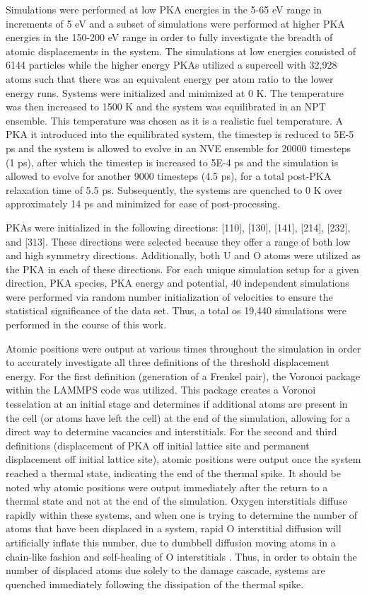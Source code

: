 \documentclass[8pt]{article}   	%
\begin{document}
Simulations were performed at low PKA energies in the 5-65 eV range in increments of 5 eV and a subset of simulations were performed at higher PKA energies in the 150-200 eV range in order to fully investigate the breadth of atomic displacements in the system. The simulations at low energies consisted of 6144 particles while the higher energy PKAs utilized a supercell with 32,928 atoms such that there was an equivalent energy per atom ratio to the lower energy runs. Systems were initialized and minimized at 0 K. The temperature was then increased to 1500 K and the system was equilibrated in an NPT ensemble. This temperature was chosen as it is a realistic fuel temperature. A PKA it introduced into the equilibrated system, the timestep is reduced to 5E-5 ps and the system is allowed to evolve in an NVE ensemble for 20000 timesteps (1 ps), after which the timestep is increased to 5E-4 ps and the simulation is allowed to evolve for another 9000 timesteps (4.5 ps), for a total post-PKA relaxation time of 5.5 ps.  Subsequently, the systems are quenched to 0 K over approximately 14 ps and minimized for ease of post-processing. 

PKAs were initialized in the following directions: [110], [130], [141], [214], [232], and [313]. These directions were selected because they offer a range of both low and high symmetry directions. Additionally, both U and O atoms were utilized as the PKA in each of these directions. For each unique simulation setup for a given direction, PKA species, PKA energy and potential, 40 independent simulations were performed via random number initialization of velocities to ensure the statistical significance of the data set. Thus, a total os 19,440 simulations were performed in the course of this work.

Atomic positions were output at various times throughout the simulation in order to accurately investigate all three definitions of the threshold displacement energy. For the first definition (generation of a Frenkel pair), the Voronoi package within the LAMMPS code \cite{lammps,voro} was utilized. This package creates a Voronoi tesselation at an initial stage and determines if additional atoms are present in the cell (or atoms have left the cell) at the end of the simulation, allowing for a direct way to determine vacancies and interstitials. For the second and third definitions (displacement of PKA off initial lattice site and permanent displacement off initial lattice site), atomic positions were output once the system reached a thermal state, indicating the end of the thermal spike. It should be noted why atomic positions were output immediately after the return to a thermal state and not at the end of the simulation. Oxygen interstitials diffuse rapidly within these systems, and when one is trying to determine the number of atoms that have been displaced in a system, rapid O interstitial diffusion will artificially inflate this number, due to dumbbell diffusion moving atoms in a chain-like fashion and self-healing of O interstitials \cite{ajay}. Thus, in order to obtain the number of displaced atoms due solely to the damage cascade, systems are quenched immediately following the dissipation of the thermal spike.
\end{document}
